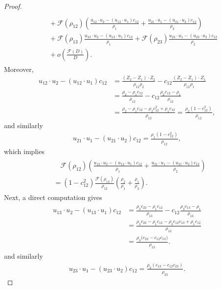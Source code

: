 \documentclass[reqno]{amsart}
\theoremstyle{plain}
\theoremstyle{definition}
\numberwithin{equation}{section}
\newcommand{\1}{\mathbbm{1}}
\begin{document}
\begin{proof}
\begin{align}
\begin{aligned}
\\
&\quad+\mathcal{F}(\rho_{12})\left( \frac{u_{12}\cdot u_2-(u_{12}\cdot u_1)c_{12}}{\rho_1}+\frac{u_{21}\cdot u_1-(u_{21}\cdot u_2)c_{12}}{\rho_2}\right)
\\
&\quad+\mathcal{F}(\rho_{13})\frac{u_{13}\cdot u_2-(u_{13}\cdot u_1)c_{12}}{\rho_1}+\mathcal{F}(\rho_{23})\frac{u_{23}\cdot u_1-(u_{23}\cdot u_2)c_{12}}{\rho_2}
\\
&\quad+o\left(\frac{\mathcal{F}(D)}{D}\right).
\end{aligned}
\end{align}
Moreover,
\begin{align*}
u_{12}\cdot u_2-(u_{12}\cdot u_1)c_{12}&=\frac{(Z_2-Z_1)\cdot Z_2}{\rho_{12}\rho_2}-c_{12}\frac{(Z_2-Z_1)\cdot Z_1}{\rho_{12}\rho_1}
\\
&=\frac{\rho_2-\rho_1c_{12}}{\rho_{12}}
-c_{12}\frac{\rho_2c_{12}-\rho_1}{\rho_{12}}\\
&=\frac{\rho_2-\rho_1c_{12}-\rho_2c_{12}^2+\rho_1c_{12}}{\rho_{12}}
=\frac{\rho_2(1-c_{12}^2)}{\rho_{12}},
\end{align*}
and similarly
\begin{align*}
u_{21}\cdot u_1-(u_{21}\cdot u_2)c_{12}=\frac{\rho_1(1-c_{12}^2)}{\rho_{12}},
\end{align*}
which implies
\begin{align}\label{c12cal5}
\begin{aligned}
&\quad \mathcal{F}(\rho_{12})\left( \frac{u_{12}\cdot u_2-(u_{12}\cdot u_1)c_{12}}{\rho_1}+\frac{u_{21}\cdot u_1-(u_{21}\cdot u_2)c_{12}}{\rho_2}\right)
\\
&=(1-c_{12}^2)\frac{\mathcal{F}(\rho_{12})}{\rho_{12}}\left(\frac{\rho_2}{\rho_1}+\frac{\rho_1}{\rho_2}\right).
\end{aligned}
\end{align}
Next, a direct computation gives
\begin{align}\label{c12cal6}
\begin{aligned}
u_{13}\cdot u_2-(u_{13}\cdot u_1)c_{12}&=\frac{\rho_3c_{23}-\rho_1c_{12}}{\rho_{13}}
-c_{12}\frac{\rho_3c_{13}-\rho_1}{\rho_{13}}\\
&=\frac{\rho_3c_{23}-\rho_1c_{12}-\rho_3c_{12}c_{13}+\rho_1c_{12}}{\rho_{13}}\\
&=\frac{\rho_3\bigl(c_{23}-c_{12}c_{13}\bigr)}{\rho_{13}}.
\end{aligned}
\end{align}
and similarly
\begin{align}\label{c12cal7}
u_{23}\cdot u_1-(u_{23}\cdot u_2)c_{12}=\frac{\rho_3(c_{13}-c_{12}c_{23})}{\rho_{23}}.

\end{align}
\end{proof}
\end{document}
